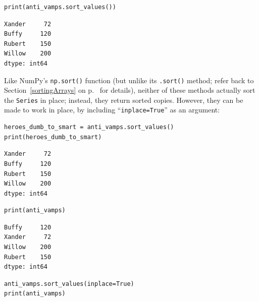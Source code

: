 \begin{Verbatim}[fontsize=\small,samepage=true,frame=single,framesep=3mm]
print(anti_vamps.sort_values())
\end{Verbatim}
\vspace{-.3in}

\begin{Verbatim}[fontsize=\small,samepage=true,frame=leftline,framesep=5mm,framerule=1mm]
Xander     72
Buffy     120
Rubert    150
Willow    200
dtype: int64
\end{Verbatim}


Like NumPy's \texttt{np.sort()} function (but unlike its \texttt{.sort()}
method; refer back to Section~\ref{sortingArrays} on p.~\pageref{sortingArrays}
for details), neither of these methods actually sort the \texttt{Series} in
place; instead, they return sorted copies. However, they can be made to work in
place, by including ``\texttt{inplace=True}'' as an argument:

\begin{Verbatim}[fontsize=\small,samepage=true,frame=single,framesep=3mm]
heroes_dumb_to_smart = anti_vamps.sort_values()
print(heroes_dumb_to_smart)
\end{Verbatim}
\vspace{-.3in}

\begin{Verbatim}[fontsize=\small,samepage=true,frame=leftline,framesep=5mm,framerule=1mm]
Xander     72
Buffy     120
Rubert    150
Willow    200
dtype: int64
\end{Verbatim}

\begin{Verbatim}[fontsize=\small,samepage=true,frame=single,framesep=3mm]
print(anti_vamps)
\end{Verbatim}
\vspace{-.3in}

\begin{Verbatim}[fontsize=\small,samepage=true,frame=leftline,framesep=5mm,framerule=1mm]
Buffy     120
Xander     72
Willow    200
Rubert    150
dtype: int64
\end{Verbatim}

\begin{Verbatim}[fontsize=\small,samepage=true,frame=single,framesep=3mm]
anti_vamps.sort_values(inplace=True)
print(anti_vamps)
\end{Verbatim}
\vspace{-.3in}

